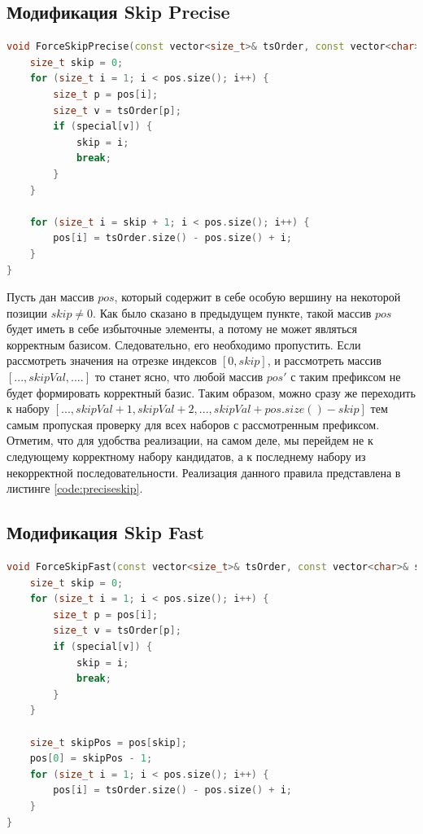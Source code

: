 \documentclass[12pt,a4paper,oneside,openany]{article}
\theoremstyle{definition}
\theoremstyle{lemma}
\theoremstyle{remark}
\begin{document}
\subsection{Модификация Skip Precise}\label{subsec:preciseskip}

\begin{lstlisting}[language=C++, caption=Пропуск сразу нескольких наборов кандидатов без ложно-отрицательных результатов, label=code:preciseskip]
void ForceSkipPrecise(const vector<size_t>& tsOrder, const vector<char>& special, std::vector<size_t>& pos) {
    size_t skip = 0;
    for (size_t i = 1; i < pos.size(); i++) {
        size_t p = pos[i];
        size_t v = tsOrder[p];
        if (special[v]) {
            skip = i;
            break;
        }
    }

    for (size_t i = skip + 1; i < pos.size(); i++) {
        pos[i] = tsOrder.size() - pos.size() + i;
    }
}
\end{lstlisting}

Пусть дан массив $pos$, который содержит в себе особую вершину на некоторой позиции $skip \neq 0$.
Как было сказано в предыдущем пункте, такой массив $pos$ будет иметь в себе избыточные элементы, а
потому не может являться корректным базисом. Следовательно, его необходимо пропустить.
Если рассмотреть значения на отрезке индексов $[0, skip]$, и рассмотреть массив $[..., skipVal, ....]$ то станет ясно, что любой массив $pos'$
с таким префиксом не будет формировать корректный базис. Таким образом, можно сразу же переходить
к набору $[..., skipVal + 1, skipVal + 2, ..., skipVal + pos.size() - skip]$
тем самым пропуская проверку для всех наборов с рассмотренным префиксом.
Отметим, что для удобства реализации, на самом деле, мы перейдем не к следующему корректному набору
кандидатов, а к последнему набору из некорректной последовательности.
Реализация данного правила представлена в листинге \ref{code:preciseskip}.

\subsection{Модификация Skip Fast}\label{subsec:fastskip}

\begin{lstlisting}[language=C++, caption=Пропуск большого числа кандидатов. Допускаются ложно-отрицательные результаты., label=code:fastskip]
void ForceSkipFast(const vector<size_t>& tsOrder, const vector<char>& special, std::vector<size_t>& pos) {
    size_t skip = 0;
    for (size_t i = 1; i < pos.size(); i++) {
        size_t p = pos[i];
        size_t v = tsOrder[p];
        if (special[v]) {
            skip = i;
            break;
        }
    }

    size_t skipPos = pos[skip];
    pos[0] = skipPos - 1;
    for (size_t i = 1; i < pos.size(); i++) {
        pos[i] = tsOrder.size() - pos.size() + i;
    }
}
\end{lstlisting}
\end{document}
